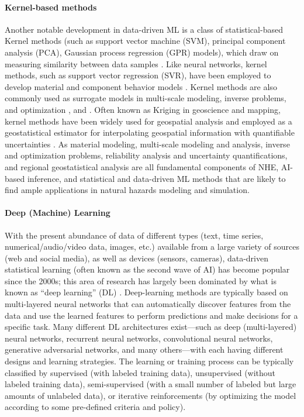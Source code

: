\paragraph{Kernel-based methods} Another notable development in data-driven ML is a class of statistical-based Kernel methods (such as support vector machine (SVM), principal component analysis (PCA), Gaussian process regression (GPR) models), which draw on measuring similarity between data samples \citep{rasmussen2006gaussian,hofmann2008kernel}. Like neural networks, kernel methods, such as support vector regression (SVR), have been employed to develop material and component behavior models \citep[see, e.g.][]{luo2018machine}. Kernel methods are also commonly used as surrogate models in multi-scale modeling, inverse problems, and optimization \citep{wirtz2012surrogate, park2016bayesian, eriksson2018scalable}, and \citep{santin2019kernel}. Often known as Kriging in geoscience and mapping, kernel methods have been widely used for geospatial analysis and employed as a geostatistical estimator for interpolating geospatial information with quantifiable uncertainties \citep{olea2012geostatistics,jia2016surrogate}. As material modeling, multi-scale modeling and analysis, inverse and optimization problems, reliability analysis and uncertainty quantifications, and regional geostatistical analysis are all fundamental components of NHE, AI-based inference, and statistical and data-driven ML methods that are likely to find ample applications in natural hazards modeling and simulation. 

\paragraph{Deep (Machine) Learning} With the present abundance of data of different types (text, time series, numerical/audio/video data, images, etc.) available from a large variety of sources (web and social media), as well as devices (sensors, cameras), data-driven statistical learning (often known as the second wave of AI) has become popular since the 2000s; this area of research has largely been dominated by what is known as ``deep learning'' (DL) \citep{lecun2015deep}. Deep-learning methods are typically based on multi-layered neural networks that can automatically discover features from the data and use the learned features to perform predictions and make decisions for a specific task. Many different DL architectures exist---such as deep (multi-layered) neural networks, recurrent neural networks, convolutional neural networks, generative adversarial networks, and many others---with each having different designs and learning strategies. The learning or training process can be typically classified by supervised (with labeled training data), unsupervised (without labeled training data), semi-supervised (with a small number of labeled but large amounts of unlabeled data), or iterative reinforcements (by optimizing the model according to some pre-defined criteria and policy).

